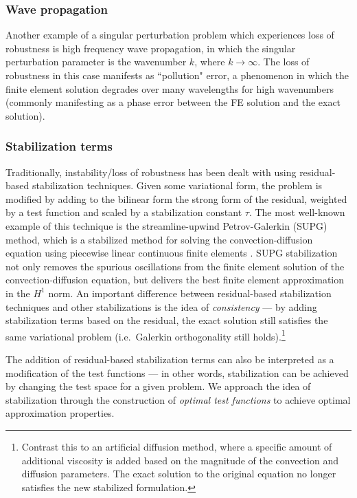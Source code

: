 \documentclass[11pt,onecolumn]{scrartcl}
\begin{document}

\subsubsection{Wave propagation}

Another example of a singular perturbation problem which experiences loss of robustness is high frequency wave propagation, in which the singular perturbation parameter is the wavenumber $k$, where $k\rightarrow \infty$. The loss of robustness in this case manifests as ``pollution" error, a phenomenon in which the finite element solution degrades over many wavelengths for high wavenumbers (commonly manifesting as a phase error between the FE solution and the exact solution).  

\subsubsection{Stabilization terms}

Traditionally, instability/loss of robustness has been dealt with using residual-based stabilization techniques.  Given some variational form, the problem is modified by adding to the bilinear form the strong form of the residual, weighted by a test function and scaled by a stabilization constant $\tau$.  The most well-known example of this technique is the streamline-upwind Petrov-Galerkin (SUPG) method, which is a stabilized method for solving the convection-diffusion equation using piecewise linear continuous finite elements \cite{SUPG}.  SUPG stabilization not only removes the spurious oscillations from the finite element solution of the convection-diffusion equation, but delivers the best finite element approximation in the $H^1$ norm.  An important difference between residual-based stabilization techniques and other stabilizations is the idea of \textit{consistency} --- by adding stabilization terms based on the residual, the exact solution still satisfies the same variational problem (i.e.\ Galerkin orthogonality still holds).\footnote{Contrast this to an artificial diffusion method, where a specific amount of additional viscosity is added based on the magnitude of the convection and diffusion parameters. The exact solution to the original equation no longer satisfies the new stabilized formulation.}

The addition of residual-based stabilization terms can also be interpreted as a modification of the test functions --- in other words, stabilization can be achieved by changing the test space for a given problem.  We approach the idea of stabilization through the construction of \textit{optimal test functions} to achieve optimal approximation properties.
\end{document}
